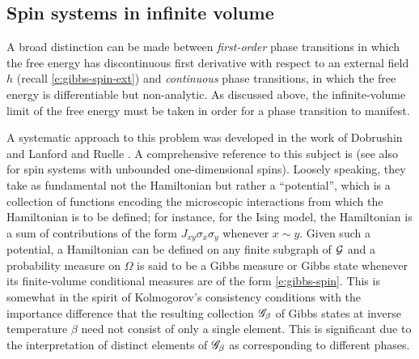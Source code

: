 \subsection{Spin systems in infinite volume}

A broad distinction can be made between \emph{first-order} phase transitions
in which the
free energy has discontinuous first derivative with respect to an external
field $h$ (recall \eqref{e:gibbs-spin-ext}) and \emph{continuous} phase
transitions, in which the free energy is differentiable but non-analytic.
As discussed above, the infinite-volume limit of the free energy must be taken
in order for a phase transition to manifest.



A systematic approach to this problem was developed in the work of Dobrushin \cite{Dobrushin68}
and Lanford and Ruelle \cite{LR69}. A comprehensive reference to this subject is \cite{Georgii11}
(see also \cite{LP76} for spin systems with unbounded one-dimensional spins).
Loosely speaking, they take as fundamental not the Hamiltonian
but rather a ``potential'', which is a collection of functions encoding the microscopic interactions
from which the Hamiltonian is to be defined; for instance, for the Ising model,
the Hamiltonian is a sum of contributions of the form $J_{xy} \sigma_x \sigma_y$ whenever
$x \sim y$. Given such a potential, a Hamiltonian can be defined on any
finite subgraph of $\mathcal{G}$ and a probability measure on $\Omega$ is said to be a Gibbs
measure or Gibbs state whenever its finite-volume conditional measures are of the form \eqref{e:gibbs-spin}.
This is somewhat in the spirit of Kolmogorov's consistency conditions with the importance
difference that the resulting collection $\mathscr{G}_\beta$ of Gibbs states at inverse temperature
$\beta$ need not consist of only a single element. This is significant due to the interpretation
of distinct elements of $\mathscr{G}_\beta$ as corresponding to different phases.


